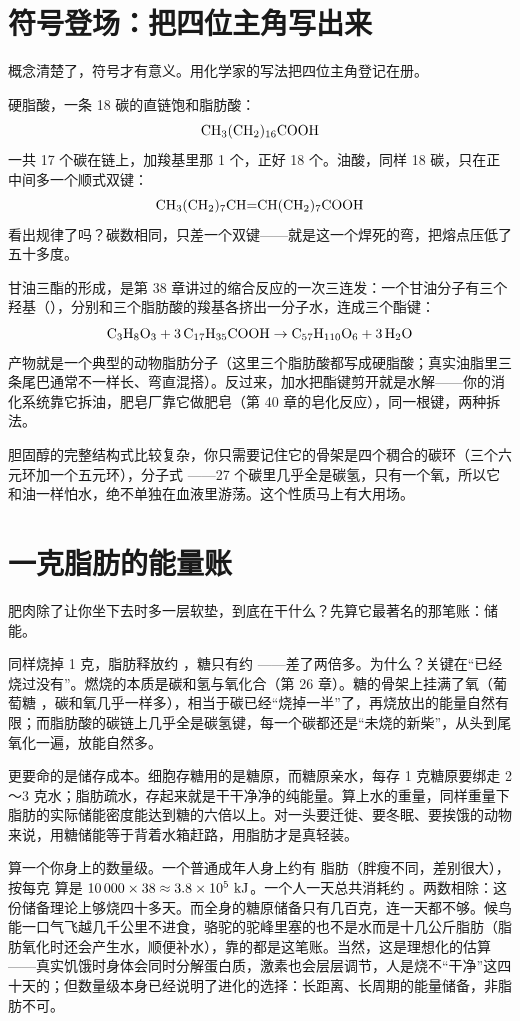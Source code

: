 \section{符号登场：把四位主角写出来}

概念清楚了，符号才有意义。用化学家的写法把四位主角登记在册。

硬脂酸，一条 18 碳的直链饱和脂肪酸：\[\mathrm{CH_3(CH_2)_{16}COOH}\]一共 17 个碳在链上，加羧基里那 1 个，正好 18 个。油酸，同样 18 碳，只在正中间多一个顺式双键：\[\mathrm{CH_3(CH_2)_7CH{=}CH(CH_2)_7COOH}\]看出规律了吗？碳数相同，只差一个双键——就是这一个焊死的弯，把熔点压低了五十多度。

甘油三酯的形成，是第 38 章讲过的缩合反应的一次三连发：一个甘油分子有三个羟基（），分别和三个脂肪酸的羧基各挤出一分子水，连成三个酯键：\[\mathrm{C_3H_8O_3} + 3\,\mathrm{C_{17}H_{35}COOH} \rightarrow \mathrm{C_{57}H_{110}O_6} + 3\,\mathrm{H_2O}\]产物就是一个典型的动物脂肪分子（这里三个脂肪酸都写成硬脂酸；真实油脂里三条尾巴通常不一样长、弯直混搭）。反过来，加水把酯键剪开就是水解——你的消化系统靠它拆油，肥皂厂靠它做肥皂（第 40 章的皂化反应），同一根键，两种拆法。

胆固醇的完整结构式比较复杂，你只需要记住它的骨架是四个稠合的碳环（三个六元环加一个五元环），分子式 ——27 个碳里几乎全是碳氢，只有一个氧，所以它和油一样怕水，绝不单独在血液里游荡。这个性质马上有大用场。

\section{一克脂肪的能量账}

肥肉除了让你坐下去时多一层软垫，到底在干什么？先算它最著名的那笔账：储能。

\begin{qiaoliang}
同样烧掉 1 克，脂肪释放约 ，糖只有约 ——差了两倍多。为什么？关键在“已经烧过没有”。燃烧的本质是碳和氢与氧化合（第 26 章）。糖的骨架上挂满了氧（葡萄糖 ，碳和氧几乎一样多），相当于碳已经“烧掉一半”了，再烧放出的能量自然有限；而脂肪酸的碳链上几乎全是碳氢键，每一个碳都还是“未烧的新柴”，从头到尾氧化一遍，放能自然多。

更要命的是储存成本。细胞存糖用的是糖原，而糖原亲水，每存 1 克糖原要绑走 2～3 克水；脂肪疏水，存起来就是干干净净的纯能量。算上水的重量，同样重量下脂肪的实际储能密度能达到糖的六倍以上。对一头要迁徙、要冬眠、要挨饿的动物来说，用糖储能等于背着水箱赶路，用脂肪才是真轻装。
\end{qiaoliang}

算一个你身上的数量级。一个普通成年人身上约有  脂肪（胖瘦不同，差别很大），按每克  算是 $10\,000 \times 38 \approx 3.8\times 10^{5}\ \mathrm{kJ}$。一个人一天总共消耗约 。两数相除：这份储备理论上够烧四十多天。而全身的糖原储备只有几百克，连一天都不够。候鸟能一口气飞越几千公里不进食，骆驼的驼峰里塞的也不是水而是十几公斤脂肪（脂肪氧化时还会产生水，顺便补水），靠的都是这笔账。当然，这是理想化的估算——真实饥饿时身体会同时分解蛋白质，激素也会层层调节，人是烧不“干净”这四十天的；但数量级本身已经说明了进化的选择：长距离、长周期的能量储备，非脂肪不可。

